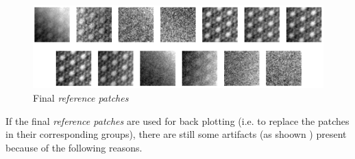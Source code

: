 \documentclass[fleqn,10pt]{wlscirep}
\begin{document}

\begin{figure}
	\centering
	\includegraphics[scale=0.8]{./imgs/final_reference_patches.png}
	\caption{Final \textit{reference patches}}
	\label{fig:final_reference_patches}
\end{figure} 

If the final \textit{reference patches} are used for back plotting (i.e. to replace the patches in their corresponding groups), there are still some artifacts (as shoown ) present because of the following reasons. 

\end{document}
